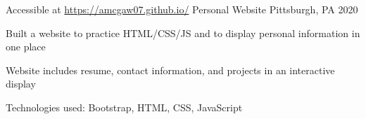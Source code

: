\documentclass[]{awesome-cv}
\begin{document}
\begin{cventries}
	\cventry
	{Accessible at \href{https://amcgaw07.github.io/} {https://amcgaw07.github.io/}}
	{Personal Website}
	{Pittsburgh, PA}
	{2020}
	{\begin{cvitems}
		\item {Built a website to practice HTML/CSS/JS and to display personal information in one place}
		\item {Website includes resume, contact information, and projects in an interactive display}
		\item {Technologies used: Bootstrap, HTML, CSS, JavaScript}
		\end{cvitems}}


\end{cventries}
\end{document}
